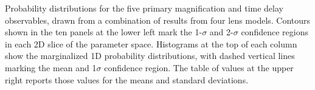 Probability distributions for the five primary magnification and time
delay observables, drawn from a combination of results from four lens
models.   Contours shown in the ten panels at the
lower left mark the 1-$\sigma$ and 2-$\sigma$ confidence regions in
each 2D slice of the parameter space. Histograms at the top of each
column show the marginalized 1D probability distributions, with dashed
vertical lines marking the mean and 1$\sigma$ confidence region.  The
table of values at the upper right reports those values for the means
and standard deviations.
\label{fig:LensModelContours}
